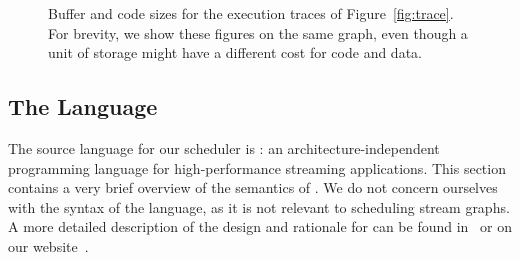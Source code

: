 \documentclass{sig-alt-full}
\begin{document}
\begin{comment}

\subsection{Minimum Buffer Size between {\filters}}

As illustrated above, the amount of buffering in a {\pipeline} can
be affected greatly by the order of executions of {\filters} in the
{\pipeline}.  The following equation calculates the minimal buffer
size required in order for two {\filters} to be able to push data
between each other indefinitely in the most buffer-efficient way.
Buffers this size cannot always be achieved, because some
components require that data be buffered up for execution (ex.
{\feedbackloops} require data to exist internally in order to
execution to advance) or because extra latency constrains require
additional buffering.

\begin{equation}
buffer_{A \to B} = \left\lceil {{peek_B} \over {\gcd(push_A,
pop_B)}} - 1 \right\rceil \gcd (push_A, pop_B) + push_A
\end{equation}

\emph{I can explain this equation, but I cannot prove it.  what
should I do with this?  it's not necessary for the thesis, but it
is a neat result we never published (PLDI submission), nor have I
seen it in any other papers (nobody does peeking, so it can't be
anywhere else)}

\end{comment}

\begin{figure}[t]
\caption{\small Buffer and code sizes for the execution traces of
Figure~\ref{fig:trace}.  For brevity, we show these figures on the
same graph, even though a unit of storage might have a different cost
for code and data.\protect\label{fig:codedata}}
\end{figure}

%
\subsection{The {\StreamIt} Language}
\label{sec:streamit}

The source language for our scheduler is {\StreamIt}: an
architecture-independent programming language for high-performance
streaming applications.  This section contains a very brief overview
of the semantics of {\StreamIt}.  We do not concern ourselves with the
syntax of the language, as it is not relevant to scheduling stream
graphs. A more detailed description of the design and rationale for
{\StreamIt} can be found in~\cite{thies02streamit} or on our
website~\cite{streamitweb}.
\end{document}
